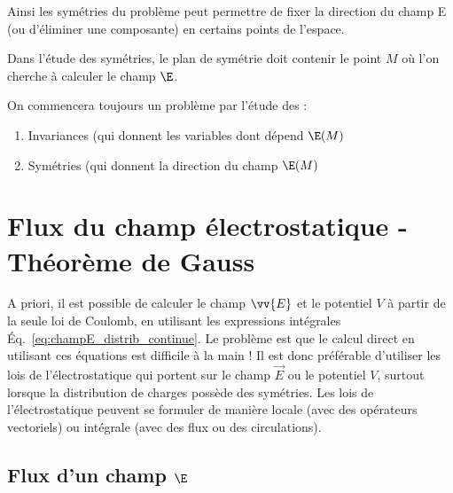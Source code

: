 \documentclass[12pt,fancy]{/Users/victor/Documents/COURS/2ACapECL/texmf/tex/latex/Preambles/cours}
\begin{document}
\noindent Ainsi les symétries du problème peut permettre de fixer la direction du champ E (ou d’éliminer une composante) en certains points de l’espace.

\begin{liste}
\item Dans l'étude des symétries, le plan de symétrie doit contenir le point $M$ où l'on cherche à calculer le champ $\E$.
\item On commencera toujours un problème par l'étude des :
\begin{enumerate}
\item Invariances (qui donnent les variables dont dépend $\E(M)$
\item Symétries (qui donnent la direction du champ $\E(M)$
\end{enumerate}
\end{liste}

\section{Flux du champ électrostatique - Théorème de Gauss}
\label{sec:Gauss}
A priori, il est possible de calculer le champ $\vv{E}$ et le potentiel $V$ à partir de la seule loi de Coulomb, en utilisant les expressions intégrales Éq.~\eqref{eq:champE_distrib_continue}. Le problème est que le calcul direct en utilisant ces équations est difficile à la main ! Il est donc préférable d'utiliser les lois de l’électrostatique qui portent sur le champ $\Vec{E}$ ou le potentiel $V$, surtout lorsque la distribution de charges possède des symétries. Les lois de l’électrostatique peuvent se formuler de manière locale (avec des opérateurs vectoriels) ou intégrale (avec des flux ou des circulations).

\subsection{Flux d'un champ $\E$}
\end{document}
